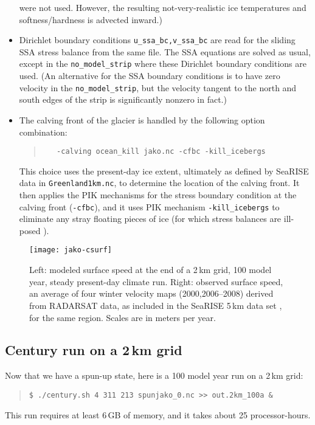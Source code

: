 \begin{itemize}
\begin{quote}
\normalsize\end{quote}
were not used.  However, the resulting not-very-realistic ice temperatures and softness/hardness is advected inward.)
\item Dirichlet boundary conditions \verb|u_ssa_bc,v_ssa_bc| are read for the sliding SSA stress balance from the same file.  The SSA equations are solved as usual, except in the \verb|no_model_strip| where these Dirichlet boundary conditions are used.  (An alternative for the SSA boundary conditions is to have zero velocity in the \verb|no_model_strip|, but the velocity tangent to the north and south edges of the strip is significantly nonzero in fact.)
\item The calving front of the glacier is handled by the following option combination:
\begin{quote}\small
\begin{verbatim}
   -calving ocean_kill jako.nc -cfbc -kill_icebergs
\end{verbatim}
\normalsize\end{quote}
This choice uses the present-day ice extent, ultimately as defined by SeaRISE data in \verb|Greenland1km.nc|, to determine the location of the calving front.  It then applies the PIK mechanisms for the stress boundary condition at the calving front (\verb|-cfbc|), and it uses PIK mechanism \verb|-kill_icebergs| to eliminate any stray floating pieces of ice (for which stress balances are ill-posed \cite{Winkelmannetal2011}).
\end{itemize}


\begin{figure}[ht]
  \centering
  \texttt{[image: jako-csurf]}
  \caption{Left: modeled surface speed at the end of a 2\,km grid, 100 model year, steady present-day climate run.  Right: observed surface speed, an average of four winter velocity maps (2000,2006--2008) derived from RADARSAT data, as included in the SeaRISE  5\,km data set \cite{Joughinetal2010}, for the same region.  Scales are in meters per year.}
  \label{fig:jako-csurf}
\end{figure}


\subsection*{Century run on a 2\,km grid}
Now that we have a spun-up state, here is a 100 model year run on a 2\,km grid:
\begin{quote}\small
\begin{verbatim}
$ ./century.sh 4 311 213 spunjako_0.nc >> out.2km_100a &
\end{verbatim}
\normalsize\end{quote}
This run requires at least 6\,GB of memory, and it takes about 25 processor-hours.

